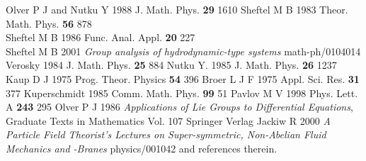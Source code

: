 \documentclass[a4paper,12pt]{article}
\begin{document}
\begin{thebibliography}{99}
 Olver P J and Nutku Y 1988 J. Math. Phys. {\bf 29} 1610
 Sheftel M B 1983 Theor. Math. Phys. {\bf 56}
878\\ Sheftel M B 1986 Func. Anal. Appl. {\bf 20} 227 \\ Sheftel M
B 2001 {\it Group analysis of hydrodynamic-type systems}
math-ph/0104014
 Verosky 1984 J. Math. Phys. {\bf 25} 884
 Nutku Y. 1985 J. Math. Phys. {\bf 26} 1237
 Kaup D J 1975 Prog. Theor. Physics {\bf 54} 396
 Broer L J F 1975 Appl. Sci. Res. {\bf 31} 377
 Kuperschmidt 1985 Comm. Math. Phys. {\bf 99} 51
 Pavlov M V 1998 Phys. Lett. A {\bf 243} 295
 Olver P J 1986 {\it Applications of Lie Groups
to Differential Equations}, Graduate
Texts in Mathematics Vol. 107 Springer Verlag
 Jackiw R 2000 {\it A Particle Field Theorist's Lectures
on Super-symmetric, Non-Abelian Fluid Mechanics and \coordHE{}-Branes}
physics/001042 and references therein.
\end{thebibliography}
\end{document}
